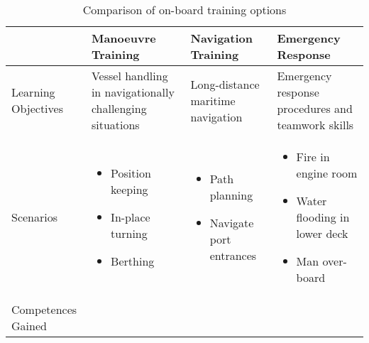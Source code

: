 \begin{table}
	\centering
	\caption{Comparison of on-board training options}
	\label{tab:trainingoptions}
	\begin{tabular}{@{}p{2.2cm}|p{3.3cm}|p{3.2cm}|p{3.3cm}|@{}}
		\toprule
		\multicolumn{1}{c|}{ } & \multicolumn{1}{P{3cm}|}{\textbf{Manoeuvre Training}} & \multicolumn{1}{P{3cm}|}{\textbf{Navigation Training}} & \multicolumn{1}{P{2.5cm}|}{\textbf{Emergency Response}} \\ 
		\hline
		Learning Objectives & Vessel handling in navigationally challenging situations & Long-distance maritime navigation & Emergency response procedures and teamwork skills \\
		\hline
		Scenarios &
		\vspace{-2mm} \begin{itemize}[leftmargin=*,topsep=0pt,align=left,itemsep=0.25pt,after=]
			\renewcommand{\labelitemi}{\scalebox{.9}{\tiny\listsymb}}
			\item Position keeping  
			\item In-place turning
			\item Berthing  
		\end{itemize}
		\vspace{-2mm}
		&\vspace{-2mm} \begin{itemize}[leftmargin=*,topsep=0pt,align=left,itemsep=0.25pt,after=]
			\renewcommand{\labelitemi}{\scalebox{.9}{\tiny\listsymb}}
			\item Path planning 
			\item Navigate port entrances
		\end{itemize} 
		\vspace{-2mm}
		& \vspace{-2mm} \begin{itemize}[leftmargin=*,topsep=0pt,align=left,itemsep=0.25pt,after=]
			\renewcommand{\labelitemi}{\scalebox{.9}{\tiny\listsymb}}
			\item Fire in engine room 
			\item Water flooding in lower deck
			\item Man over-board
		\end{itemize} \vspace{-2mm}\\
		\hline
		Competences Gained & \vspace{-2mm}\begin{itemize}[leftmargin=*,topsep=0pt,align=left,itemsep=0.25pt,after=]
			\renewcommand{\labelitemi}{\scalebox{.9}{\tiny\listsymb}}

\end{itemize}
\end{tabular}
\end{table}
